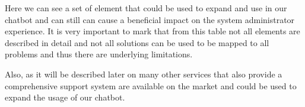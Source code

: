 \begin{table}[h]
\centering
\caption{Services and Pricing from Sula \cite{recomendationSystem}}
\end{table}

Here we can see a set of element that could be used to expand and use in our chatbot and can still can cause a beneficial impact on the system administrator experience. It is very important to mark that from this table not all elements are described in detail and not all solutions can be used to be mapped to all problems and thus there are underlying limitations.

Also, as it will be described later on many other services that also provide a comprehensive support system are available on the market and could be used to expand the usage of our chatbot.